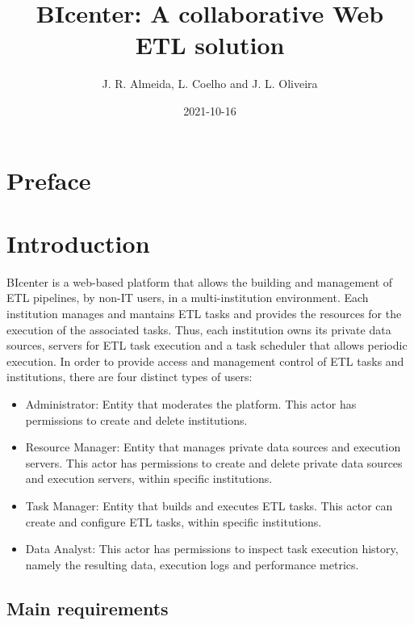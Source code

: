 \documentclass[
  11pt,
]{krantz}
\title{BIcenter: A collaborative Web ETL solution}
\author{J. R. Almeida, L. Coelho and J. L. Oliveira}
\date{2021-10-16}
\providecommand{\tightlist}{%
  \setlength{\itemsep}{0pt}\setlength{\parskip}{0pt}}
\begin{document}
\maketitle

{
\hypersetup{linkcolor=}
\setcounter{tocdepth}{1}
\tableofcontents
}
\listoffigures
\listoftables
\hypertarget{preface}{%
\chapter*{Preface}\label{preface}}


\mainmatter

\hypertarget{introduction}{%
\chapter{Introduction}\label{introduction}}

BIcenter is a web-based platform that allows the building and management of ETL pipelines, by non-IT users, in a multi-institution environment. Each institution manages and mantains ETL tasks and provides the resources for the execution of the associated tasks. Thus, each institution owns its private data sources, servers for ETL task execution and a task scheduler that allows periodic execution. In order to provide access and management control of ETL tasks and institutions, there are four distinct types of users:

\begin{itemize}
\tightlist
\item
  Administrator: Entity that moderates the platform. This actor has permissions to create and delete institutions.
\item
  Resource Manager: Entity that manages private data sources and execution servers. This actor has permissions to create and delete private data sources and execution servers, within specific institutions.
\item
  Task Manager: Entity that builds and executes ETL tasks. This actor can create and configure ETL tasks, within specific institutions.
\item
  Data Analyst: This actor has permissions to inspect task execution history, namely the resulting data, execution logs and performance metrics.
\end{itemize}

\hypertarget{main-requirements}{%
\section{Main requirements}\label{main-requirements}}
\end{document}
